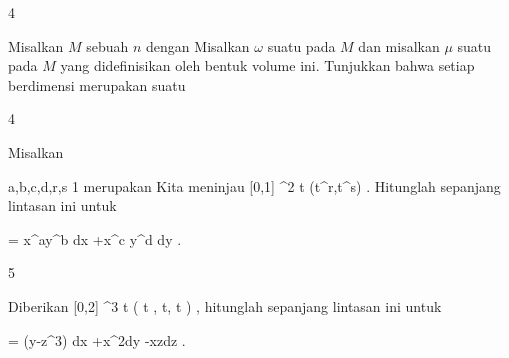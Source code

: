 
{4}
{

Misalkan $M$ sebuah
 $n$
dengan
Misalkan $\omega$ suatu
 pada $M$ dan misalkan $\mu$ suatu
 pada $M$ yang didefinisikan oleh bentuk volume ini. Tunjukkan bahwa setiap
 berdimensi
 merupakan suatu

}
{} {}

{4}
{

Misalkan

\mavergleichskette
{\vergleichskette
{a,b,c,d,r,s
}
{ \geq }{ 1
}
{  }{
}
{    }{
}
{   }{
}
}
{}{}{}
merupakan
Kita meninjau
\maabbeledisp {} { [0,1] } {\R^2
} { t } {(t^r,t^s)
} {.}
Hitunglah
sepanjang lintasan ini untuk

\mavergleichskette
{\vergleichskette
{ \omega
}
{ = }{ x^ay^b dx +x^c y^d dy
}
{  }{
}
{    }{
}
{   }{
}
}
{}{}{.}

}
{} {}

{5}
{

Diberikan
\maabbeledisp {\gamma} { [0,2\pi] } {\R^3
} { t } {( \cos  t , \sin  t, t )
} {,}
hitunglah
sepanjang lintasan ini untuk

\mavergleichskette
{\vergleichskette
{ \omega
}
{ = }{ (y-z^3) dx +x^2dy -xzdz
}
{  }{
}
{    }{
}
{   }{
}
}
{}{}{.}

}
{} {}
